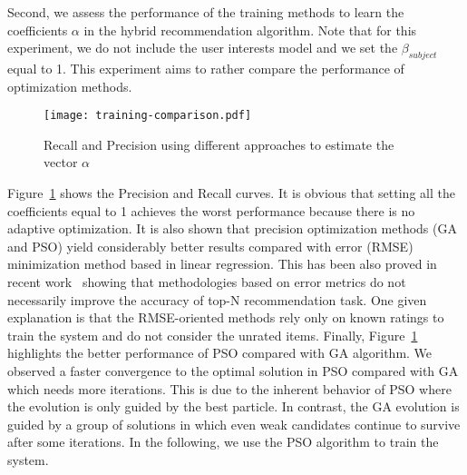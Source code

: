 \begin{table}[H]
\end{table}

Second, we assess the performance of the training methods to learn the coefficients $\alpha$ in the hybrid recommendation algorithm. Note that for this experiment, we do not include the user interests model and we set the $\beta_{subject}$ equal to 1. This experiment aims to rather compare the performance of optimization methods. 

\begin{figure}[htb]
  \centering
  \texttt{[image: training-comparison.pdf]}
  \caption{Recall and Precision using different approaches to estimate the vector $\alpha$}
  \label{fig:training-comparison}
\end{figure}

Figure~\ref{fig:training-comparison} shows the Precision and Recall curves. It is obvious that setting all the coefficients equal to 1 achieves the worst performance because there is no adaptive optimization. It is also shown that precision optimization methods (GA and PSO) yield considerably better results compared with error (RMSE) minimization method based in linear regression. This has been also proved in recent work~\cite{Cremonesi:RecSys10} showing that methodologies based on error metrics do not necessarily improve the accuracy of top-N recommendation task. One given explanation is that the RMSE-oriented methods rely only on known ratings to train the system and do not consider the unrated items. Finally, Figure~\ref{fig:training-comparison} highlights the better performance of PSO compared with GA algorithm. We observed a faster convergence to the optimal solution in PSO compared with GA which needs more iterations. This is due to the inherent behavior of PSO where the evolution is only guided by the best particle. In contrast, the GA evolution is guided by a group of solutions in which even weak candidates continue to survive after some iterations. In the following, we use the PSO algorithm to train the system.

